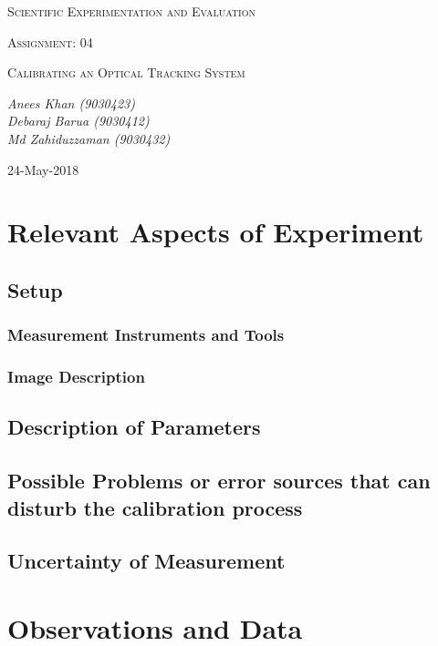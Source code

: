 \documentclass[10pt,a4paper]{article}
\begin{document}
	\begin{titlepage}
	\centering
	
		{\scshape\LARGE Scientific Experimentation and Evaluation\par}
		\vfill
		{\scshape\Large Assignment: 04\par}
		{\scshape\Large Calibrating an Optical Tracking System\par}
		\vfill
	
		\vfill
		{\Large\itshape Anees Khan (9030423)
			\\Debaraj Barua (9030412)\\
			Md Zahiduzzaman (9030432)
			\par}
		\vfill
	
		{\large 24-May-2018\par}
	\end{titlepage}
	\tableofcontents
	\newpage
	\section{Relevant Aspects of Experiment}
		\subsection{Setup}
			\subsubsection{Measurement Instruments and Tools}
			\subsubsection{Image Description}
		\subsection{Description of Parameters}
		\subsection{Possible Problems or error sources that can disturb the calibration process}
		\subsection{Uncertainty of Measurement}
		
	\section{Observations and Data}
\end{document}
